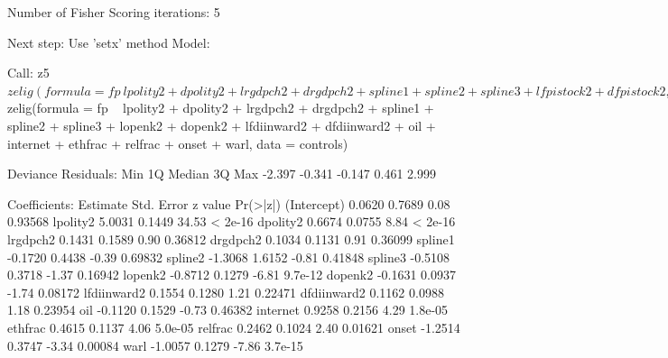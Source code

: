 \documentclass[12pt,a4paper]{article}\usepackage[]{graphicx}\usepackage[]{color}
\begin{document}
{Number of Fisher Scoring iterations: 5

Next step: Use 'setx' method
Model: 

Call:
z5$zelig(formula = fp ~ lpolity2 + dpolity2 + lrgdpch2 + drgdpch2 + 
    spline1 + spline2 + spline3 + lfpistock2 + dfpistock2, data = model4vars)

Deviance Residuals: 
   Min      1Q  Median      3Q     Max  
-2.388  -0.209   0.344   0.436   3.028  

Coefficients:
            Estimate Std. Error z value Pr(>|z|)
(Intercept) -1.61804    0.62591   -2.59  0.00974
lpolity2     5.43658    0.22826   23.82  < 2e-16
dpolity2     0.67687    0.12034    5.62  1.9e-08
lrgdpch2    -0.05704    0.20159   -0.28  0.77723
drgdpch2    -0.22396    0.20285   -1.10  0.26955
spline1     -0.00885    0.40234   -0.02  0.98246
spline2      2.19913    1.34341    1.64  0.10164
spline3      0.96867    0.26375    3.67  0.00024
lfpistock2   0.33163    0.19523    1.70  0.08937
dfpistock2   0.27881    0.12771    2.18  0.02903

(Dispersion parameter for binomial family taken to be 1)

    Null deviance: 3446.4  on 2721  degrees of freedom
Residual deviance: 1665.6  on 2712  degrees of freedom
AIC: 1686

Number of Fisher Scoring iterations: 5

Next step: Use 'setx' method
Model: 

Call:
z5$zelig(formula = fp ~ lpolity2 + dpolity2 + lrgdpch2 + drgdpch2 + 
    spline1 + spline2 + spline3 + lopenk2 + dopenk2 + lfdiinward2 + 
    dfdiinward2 + oil + internet + ethfrac + relfrac + onset + 
    warl, data = controls)

Deviance Residuals: 
   Min      1Q  Median      3Q     Max  
-2.397  -0.341  -0.147   0.461   2.999  

Coefficients:
            Estimate Std. Error z value Pr(>|z|)
(Intercept)   0.0620     0.7689    0.08  0.93568
lpolity2      5.0031     0.1449   34.53  < 2e-16
dpolity2      0.6674     0.0755    8.84  < 2e-16
lrgdpch2      0.1431     0.1589    0.90  0.36812
drgdpch2      0.1034     0.1131    0.91  0.36099
spline1      -0.1720     0.4438   -0.39  0.69832
spline2      -1.3068     1.6152   -0.81  0.41848
spline3      -0.5108     0.3718   -1.37  0.16942
lopenk2      -0.8712     0.1279   -6.81  9.7e-12
dopenk2      -0.1631     0.0937   -1.74  0.08172
lfdiinward2   0.1554     0.1280    1.21  0.22471
dfdiinward2   0.1162     0.0988    1.18  0.23954
oil          -0.1120     0.1529   -0.73  0.46382
internet      0.9258     0.2156    4.29  1.8e-05
ethfrac       0.4615     0.1137    4.06  5.0e-05
relfrac       0.2462     0.1024    2.40  0.01621
onset        -1.2514     0.3747   -3.34  0.00084
warl         -1.0057     0.1279   -7.86  3.7e-15

}
\end{document}
